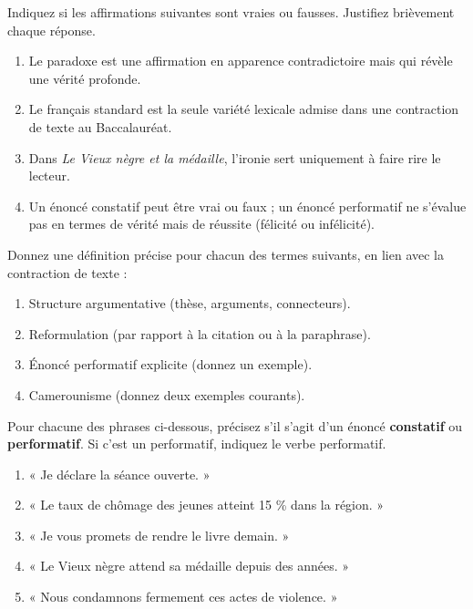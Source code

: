 \documentclass[11pt]{article}
\begin{document}
\begin{exercice}
Indiquez si les affirmations suivantes sont vraies ou fausses. Justifiez brièvement chaque réponse.
\begin{enumerate}
    \item Le paradoxe est une affirmation en apparence contradictoire mais qui révèle une vérité profonde.
    \item Le français standard est la seule variété lexicale admise dans une contraction de texte au Baccalauréat.
    \item Dans \emph{Le Vieux nègre et la médaille}, l'ironie sert uniquement à faire rire le lecteur.
    \item Un énoncé constatif peut être vrai ou faux ; un énoncé performatif ne s'évalue pas en termes de vérité mais de réussite (félicité ou infélicité).
\end{enumerate}
\end{exercice}

\begin{exercice}
Donnez une définition précise pour chacun des termes suivants, en lien avec la contraction de texte :
\begin{enumerate}
    \item Structure argumentative (thèse, arguments, connecteurs).
    \item Reformulation (par rapport à la citation ou à la paraphrase).
    \item Énoncé performatif explicite (donnez un exemple).
    \item Camerounisme (donnez deux exemples courants).
\end{enumerate}
\end{exercice}

\begin{exercice}
Pour chacune des phrases ci-dessous, précisez s'il s'agit d'un énoncé \textbf{constatif} ou \textbf{performatif}. Si c'est un performatif, indiquez le verbe performatif.
\begin{enumerate}
    \item « Je déclare la séance ouverte. »
    \item « Le taux de chômage des jeunes atteint 15 \% dans la région. »
    \item « Je vous promets de rendre le livre demain. »
    \item « Le Vieux nègre attend sa médaille depuis des années. »
    \item « Nous condamnons fermement ces actes de violence. »
\end{enumerate}
\end{exercice}
\end{document}
